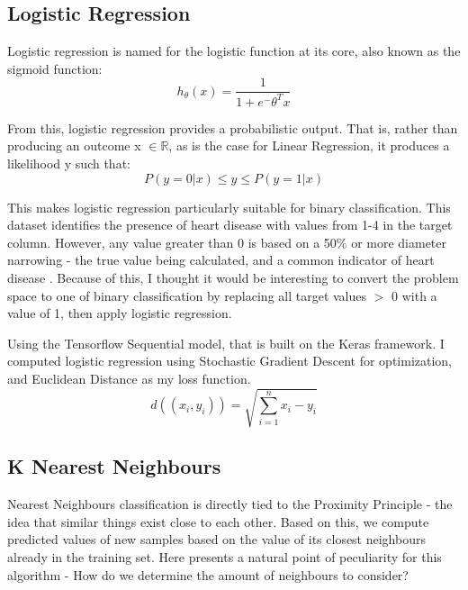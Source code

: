 \documentclass[conference]{IEEEtran}
\begin{document}
\subsection{Logistic Regression}
Logistic regression is named for the logistic function at its core, also known as the sigmoid function:
\begin{equation}
    h_ \theta (x) = \frac{\mathrm{1} }{\mathrm{1} + e^- \theta^Tx } 
\end{equation}

From this, logistic regression provides a probabilistic output. That is, rather than producing an outcome x \( \in \mathbb{R} \), as is the case for Linear Regression, it produces a likelihood y such that:
\begin{equation}
    P(y=0|x) \leq y \leq P(y=1|x)
\end{equation}

This makes logistic regression particularly suitable for binary classification. This dataset identifies the presence of heart disease with values from 1-4 in the target column. However, any value greater than 0 is based on a 50$\%$ or more diameter narrowing - the true value being calculated, and a common indicator of heart disease \cite{b13}. Because of this, I thought it would be interesting to convert the problem space to one of binary classification by replacing all target values $>$ 0 with a value of 1, then apply logistic regression.

Using the Tensorflow Sequential model, that is built on the Keras framework. I computed logistic regression using Stochastic Gradient Descent for optimization, and Euclidean Distance as my loss function. 
\begin{equation}
    d((x_i, y_i)) = \sqrt{\sum_{i=1}^{n} x_i - y_i}
\end{equation}



\subsection{K Nearest Neighbours}
Nearest Neighbours classification is directly tied to the Proximity Principle - the idea that similar things exist close to each other\cite{b14}. Based on this, we compute predicted values of new samples based on the value of its closest neighbours already in the training set. Here presents a natural point of peculiarity for this algorithm - How do we determine the amount of neighbours to consider?
\end{document}
